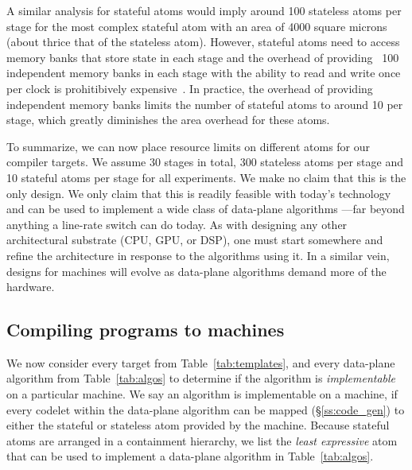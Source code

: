 A similar analysis for stateful atoms would imply around 100 stateless atoms
per stage for the most complex stateful atom with an area of 4000 square
microns (about thrice that of the stateless atom). However, stateful atoms need
to access memory banks that store state in each stage and the overhead of
providing ~100 independent memory banks in each stage with the ability to read
and write once per clock is prohitibively
expensive~\cite{private_conversations_with_mike}.  In practice, the overhead of
providing independent memory banks limits the number of stateful atoms to
around 10 per stage, which greatly diminishes the area overhead for these
atoms.

To summarize, we can now place resource limits on different atoms for our
compiler targets. We assume 30 stages in total, 300 stateless atoms per stage
and 10 stateful atoms per stage for all experiments. We make no claim that this
is the only design. We only claim that this is readily feasible with today's
technology and can be used to implement a wide class of data-plane algorithms
---far beyond anything a line-rate switch can do today. As with designing any
other architectural substrate (CPU, GPU, or DSP), one must start somewhere and
refine the architecture in response to the algorithms using it. In a similar
vein, designs for \absmachine machines will evolve as data-plane algorithms
demand more of the hardware.


\subsection{Compiling \pktlanguage programs to \absmachine machines}

We now consider every target from Table~\ref{tab:templates}, and every
data-plane algorithm from Table~\ref{tab:algos} to determine if the algorithm
is \textit{implementable} on a particular \absmachine machine. We say an
algorithm is implementable on a \absmachine machine, if every codelet within
the data-plane algorithm can be mapped (\S\ref{ss:code_gen}) to either the
stateful or stateless atom provided by the \absmachine machine. Because
stateful atoms are arranged in a containment hierarchy, we list the
\textit{least expressive} atom that can be used to implement a data-plane
algorithm in Table~\ref{tab:algos}.

